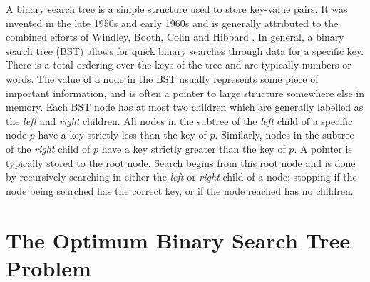 \documentclass[letterpaper,12pt,titlepage,oneside,final]{book}
\theoremstyle{plain}
\begin{document}
A binary search tree is a simple structure used to store key-value pairs. It was invented in the late 1950s and early 1960s and is generally attributed to the combined efforts of Windley, Booth, Colin and Hibbard \cite{windley1960trees, booth1960efficiency, hibbard1962some}. In general, a binary search tree (BST) allows for quick binary searches through data for a specific key. There is a total ordering over the keys of the tree and are typically numbers or words. The value of a node in the BST usually represents some piece of important information, and is often a pointer to large structure somewhere else in memory. Each BST node has at most two children which are generally labelled as the \textit{left} and \textit{right} children. All nodes in the subtree of the \textit{left} child of a specific node $p$ have a key strictly less than the key of $p$. Similarly, nodes in the subtree of the \textit{right} child of $p$ have a key strictly greater than the key of $p$. A pointer is typically stored to the root node. Search begins from this root node and is done by recursively searching in either the \textit{left} or \textit{right} child of a node; stopping if the node being searched has the correct key, or if the node reached has no children.

\section{The Optimum Binary Search Tree Problem}
\end{document}
